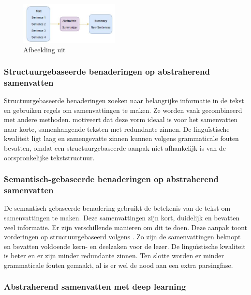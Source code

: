 \begin{figure}
	\begin{center}
		\includegraphics[width=5cm]{img/abstractive-summarization-visualization.png}
	\end{center}
	\caption{Afbeelding uit }
\end{figure}


\subsubsection{Structuurgebaseerde benaderingen op abstraherend samenvatten}

Structuurgebaseerde benaderingen zoeken naar belangrijke informatie in de tekst en gebruiken regels om samenvattingen te maken. Ze worden vaak gecombineerd met andere methoden. \textcite{Khan2014} motiveert dat deze vorm ideaal is voor het samenvatten naar korte, samenhangende teksten met redundante zinnen. De linguïstische kwaliteit ligt laag en samengevatte zinnen kunnen volgens \textcite{Khan2014} grammaticale fouten bevatten, omdat een structuurgebaseerde aanpak niet afhankelijk is van de oorspronkelijke tekststructuur.

\subsubsection{Semantisch-gebaseerde benaderingen op abstraherend samenvatten}

De semantisch-gebaseerde benadering gebruikt de betekenis van de tekst om samenvattingen te maken. Deze samenvattingen zijn kort, duidelijk en bevatten veel informatie. Er zijn verschillende manieren om dit te doen. Deze aanpak toont vorderingen op structuurgebaseerd volgens \textcite{Khan2014}. Zo zijn de samenvattingen beknopt en bevatten voldoende kern- en deelzaken voor de lezer. De linguïstische kwaliteit is beter en er zijn minder redundante zinnen. Ten slotte worden er minder grammaticale fouten gemaakt, al is er wel de nood aan een extra parsingfase.

\subsubsection{Abstraherend samenvatten met deep learning}

